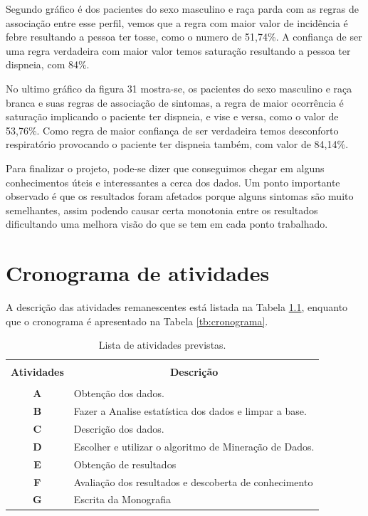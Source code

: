 \documentclass[tcc1]{uftex}
\begin{document}
    Segundo gráfico é dos pacientes do sexo masculino e raça parda com as regras de associação entre esse perfil, vemos que a regra com maior valor de incidência é febre resultando a pessoa ter tosse, como o numero de 51,74\%. A confiança de ser uma regra verdadeira com maior valor temos saturação resultando a pessoa ter dispneia, com 84\%.
    
    No ultimo gráfico da figura 31 mostra-se, os pacientes do sexo masculino e raça branca e suas regras de associação de sintomas, a regra de maior ocorrência é saturação implicando o paciente ter dispneia, e vise e versa, como o valor de 53,76\%. Como regra de maior confiança de ser verdadeira temos desconforto respiratório provocando o paciente ter dispneia também, com valor de 84,14\%.
    
    
    
    Para finalizar o projeto, pode-se dizer que conseguimos chegar em alguns conhecimentos úteis e interessantes a cerca dos dados. Um ponto importante observado é que os resultados foram afetados porque alguns sintomas são muito semelhantes, assim podendo causar certa monotonia entre os resultados dificultando uma melhora visão do que se tem em cada ponto trabalhado.

\chapter{Cronograma de atividades}
A descrição das atividades remanescentes está listada na Tabela \ref{tb:atividades}, enquanto que o cronograma é apresentado na Tabela \ref{tb:cronograma}.


\begin{table}[!h]
  \centering
  \caption{Lista de atividades previstas.}\label{tb:atividades}
  \begin{tabular}{cp{9.4cm}}
    \hline \hline &\\[-0.4cm]
    {\bf Atividades} & \multicolumn{1}{c}{\bf Descrição} \\
    \hline
    &\\[-0.4cm]
    \textbf{A} & Obtenção dos dados.\\[0.2cm]
    \textbf{B} & Fazer a Analise estatística dos dados e limpar a base.\\[0.2cm]
    \textbf{C} & Descrição dos dados.\\[0.2cm]
    \textbf{D} & Escolher e utilizar o algoritmo de Mineração de Dados.\\[0.2cm]
    \textbf{E} & Obtenção de resultados\\[0.2cm]
    \textbf{F} &  Avaliação dos resultados e descoberta de conhecimento\\[0.2cm]
    \textbf{G} &  Escrita da Monografia\\[0.2cm]
    \hline \hline
  \end{tabular}
\end{table}
\end{document}
